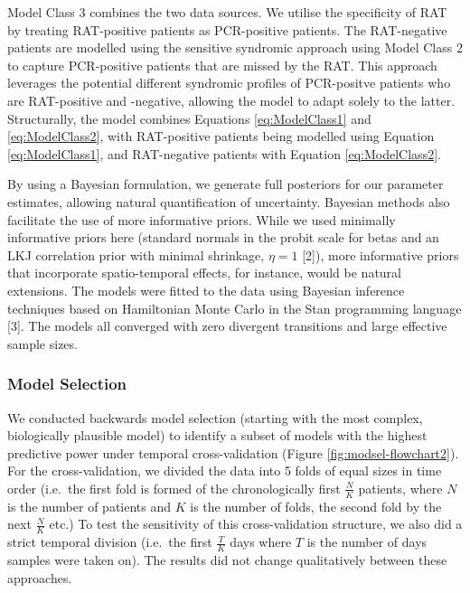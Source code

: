 \documentclass[]{elsarticle} %
\begin{document}
Model Class 3 combines the two data sources.
We utilise the specificity of RAT by treating RAT-positive patients as PCR-positive patients.
The RAT-negative patients are modelled using the sensitive syndromic approach using Model Class 2 to capture PCR-positive patients that are missed by the RAT.
This approach leverages the potential different syndromic profiles of PCR-positve patients who are RAT-positive and -negative, allowing the model to adapt solely to the latter.
Structurally, the model combines Equations \eqref{eq:ModelClass1} and \eqref{eq:ModelClass2}, with RAT-positive patients being modelled using Equation \eqref{eq:ModelClass1}, and RAT-negative patients with Equation \eqref{eq:ModelClass2}.

By using a Bayesian formulation, we generate full posteriors for our parameter estimates, allowing natural quantification of uncertainty.
Bayesian methods also facilitate the use of more informative priors.
While we used minimally informative priors here (standard normals in the probit scale for betas and an LKJ correlation prior with minimal shrinkage, \(\eta=1\) {[}2{]}), more informative priors that incorporate spatio-temporal effects, for instance, would be natural extensions.
The models were fitted to the data using Bayesian inference techniques based on Hamiltonian Monte Carlo in the Stan programming language {[}3{]}.
The models all converged with zero divergent transitions and large effective sample sizes.

\hypertarget{model-selection}{%
\subsubsection{Model Selection}\label{model-selection}}

We conducted backwards model selection (starting with the most complex, biologically plausible model) to identify a subset of models with the highest predictive power under temporal cross-validation (Figure \ref{fig:modsel-flowchart2}).
For the cross-validation, we divided the data into 5 folds of equal sizes in time order (i.e.~the first fold is formed of the chronologically first \(\frac{N}{K}\) patients, where \(N\) is the number of patients and \(K\) is the number of folds, the second fold by the next \(\frac{N}{K}\) etc.)
To test the sensitivity of this cross-validation structure, we also did a strict temporal division (i.e.~the first \(\frac{T}{K}\) days where \(T\) is the number of days samples were taken on).
The results did not change qualitatively between these approaches.
\end{document}
